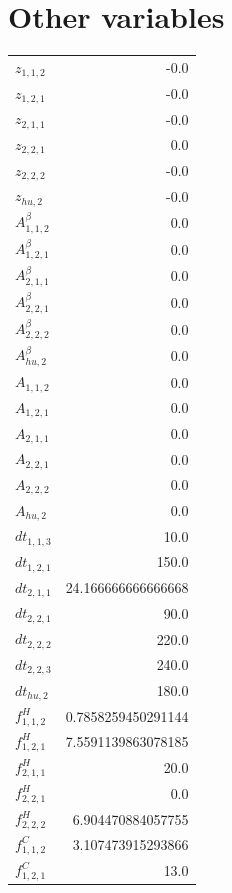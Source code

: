 \documentclass{article}%
\makeatletter
\let\mcnewpage=\newpage%
\newcommand{\TrickSupertabularIntoMulticols}{%
\renewcommand\newpage{%
\if@firstcolumn%
\hrule width\linewidth height0pt%
\columnbreak%
\else%
\mcnewpage%
\fi%
}%
}%
\makeatother
\begin{document}
\section{Other variables}%
\thispagestyle{plain}%
\begin{multicols*}{3}%
\TrickSupertabularIntoMulticols%
%
\begin{supertabular}{lr}%
	$z_{1,1,2}$ & -0.0 \\%
	$z_{1,2,1}$ & -0.0 \\%
	$z_{2,1,1}$ & -0.0 \\%
	$z_{2,2,1}$ & 0.0 \\%
	$z_{2,2,2}$ & -0.0 \\%
	$z_{hu,2}$ & -0.0 \\%
	$A_{1,1,2}^{\beta}$ & 0.0 \\%
	$A_{1,2,1}^{\beta}$ & 0.0 \\%
	$A_{2,1,1}^{\beta}$ & 0.0 \\%
	$A_{2,2,1}^{\beta}$ & 0.0 \\%
	$A_{2,2,2}^{\beta}$ & 0.0 \\%
	$A_{hu,2}^{\beta}$ & 0.0 \\%
	$A_{1,1,2}$ & 0.0 \\%
	$A_{1,2,1}$ & 0.0 \\%
	$A_{2,1,1}$ & 0.0 \\%
	$A_{2,2,1}$ & 0.0 \\%
	$A_{2,2,2}$ & 0.0 \\%
	$A_{hu,2}$ & 0.0 \\%
	$dt_{1,1,3}$ & 10.0 \\%
	$dt_{1,2,1}$ & 150.0 \\%
	$dt_{2,1,1}$ & 24.166666666666668 \\%
	$dt_{2,2,1}$ & 90.0 \\%
	$dt_{2,2,2}$ & 220.0 \\%
	$dt_{2,2,3}$ & 240.0 \\%
	$dt_{hu,2}$ & 180.0 \\%
	$f_{1,1,2}^{H}$ & 0.7858259450291144 \\%
	$f_{1,2,1}^{H}$ & 7.5591139863078185 \\%
	$f_{2,1,1}^{H}$ & 20.0 \\%
	$f_{2,2,1}^{H}$ & 0.0 \\%
	$f_{2,2,2}^{H}$ & 6.904470884057755 \\%
	$f_{1,1,2}^{C}$ & 3.107473915293866 \\%
	$f_{1,2,1}^{C}$ & 13.0 \\%

\end{supertabular}
\end{multicols*}
\end{document}
